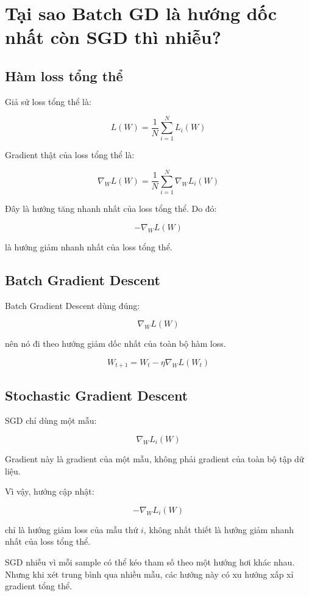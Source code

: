 \documentclass[12pt,a4paper]{report}
\begin{document}
\chapter{Tại sao Batch GD là hướng dốc nhất còn SGD thì nhiễu?}

\section{Hàm loss tổng thể}

Giả sử loss tổng thể là:

\[
    L(W)
    =
    \frac{1}{N}
    \sum_{i=1}^{N}
    L_i(W)
\]

Gradient thật của loss tổng thể là:

\[
    \nabla_W L(W)
    =
    \frac{1}{N}
    \sum_{i=1}^{N}
    \nabla_W L_i(W)
\]

Đây là hướng tăng nhanh nhất của loss tổng thể. Do đó:

\[
    -\nabla_W L(W)
\]

là hướng giảm nhanh nhất của loss tổng thể.

\section{Batch Gradient Descent}

Batch Gradient Descent dùng đúng:

\[
    \nabla_W L(W)
\]

nên nó đi theo hướng giảm dốc nhất của toàn bộ hàm loss.

\[
    W_{t+1}
    =
    W_t
    -
    \eta
    \nabla_W L(W_t)
\]

\section{Stochastic Gradient Descent}

SGD chỉ dùng một mẫu:

\[
    \nabla_W L_i(W)
\]

Gradient này là gradient của một mẫu, không phải gradient của toàn bộ tập dữ liệu.

Vì vậy, hướng cập nhật:

\[
    -\nabla_W L_i(W)
\]

chỉ là hướng giảm loss của mẫu thứ $i$, không nhất thiết là hướng giảm nhanh nhất của loss tổng thể.

\begin{luuy}
SGD nhiễu vì mỗi sample có thể kéo tham số theo một hướng hơi khác nhau. Nhưng khi xét trung bình qua nhiều mẫu, các hướng này có xu hướng xấp xỉ gradient tổng thể.
\end{luuy}
\end{document}
